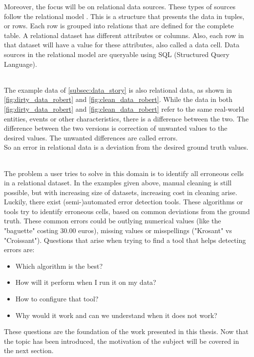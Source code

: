 Moreover, the focus will be on relational data sources. These types of sources follow the relational model \cite{Codd1970-vj}. This is a structure that presents the data in tuples, or rows. Each row is grouped into relations that are defined for the complete table. A relational dataset has different attributes or columns. Also, each row in that dataset will have a value for these attributes, also called a data cell. Data sources in the relational model are queryable using SQL (Structured Query Language). 

~\\The example data of \autoref{subsec:data_story} is also relational data, as shown in \autoref{fig:dirty_data_robert} and \autoref{fig:clean_data_robert}. While the data in both \autoref{fig:dirty_data_robert} and \autoref{fig:clean_data_robert} refer to the same real-world entities, events or other characteristics, there is a difference between the two. The difference between the two versions is correction of unwanted values to the desired values. The unwanted differences are called errors.
~\\So an error in relational data is a deviation from the desired ground truth values.

~\\The problem a user tries to solve in this domain is to identify all erroneous cells in a relational dataset. In the examples given above, manual cleaning is still possible, but with increasing size of datasets, increasing cost in cleaning arise. Luckily, there exist (semi-)automated error detection tools. These algorithms or tools try to identify erroneous cells, based on common deviations from the ground truth. These common errors could be outlying numerical values (like the "baguette" costing 30.00 euros), missing values or misspellings ("Krosant" vs "Croissant"). Questions that arise when trying to find a tool that helps detecting errors are:

\begin{itemize}
    \item Which algorithm is the best?
    \item How will it perform when I run it on my data?
    \item How to configure that tool?
    \item Why would it work and can we understand when it does not work?
\end{itemize}

These questions are the foundation of the work presented in this thesis. Now that the topic has been introduced, the motivation of the subject will be covered in the next section.